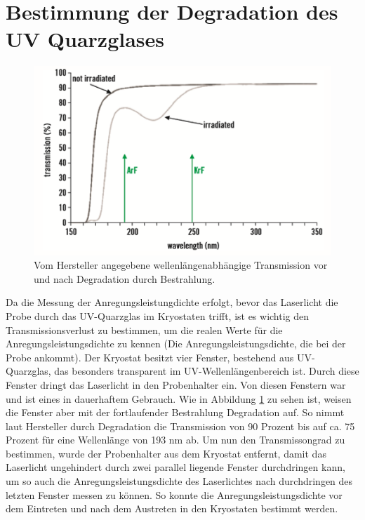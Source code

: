 
\thispagestyle{fancy}

\section{Bestimmung der Degradation des UV Quarzglases}
%
\begin{figure}[htb]
  \centering
  \begin{minipage}[t]{0.49\linewidth}
      \centering
      \includegraphics[width=\linewidth]{Bilder/uvsilicaDegradation.png}
      \caption{Vom Hersteller angegebene wellenlängenabhängige Transmission vor und nach Degradation durch Bestrahlung.}
      \label{fig:degra}
  \end{minipage}
\end{figure}
\noindent
Da die Messung der Anregungsleistungdichte erfolgt, bevor das Laserlicht die Probe durch das UV-Quarzglas im Kryostaten trifft, ist es wichtig den Transmissionsverlust zu bestimmen, um die realen Werte für die Anregungsleistungsdichte zu kennen (Die Anregungsleistungsdichte, die bei der Probe ankommt). Der Kryostat besitzt vier Fenster, bestehend aus UV-Quarzglas, das besonders transparent im UV-Wellenlängenbereich ist. Durch diese Fenster dringt das Laserlicht in den Probenhalter ein. Von diesen Fenstern war und ist eines in dauerhaftem Gebrauch. Wie in Abbildung \ref{fig:degra} zu sehen ist, weisen die Fenster aber mit der fortlaufender Bestrahlung Degradation auf. So nimmt laut Hersteller durch Degradation die Transmission von 90 Prozent bis auf ca. 75 Prozent für eine Wellenlänge von 193 nm ab.
\newline
Um nun den Transmissongrad zu bestimmen, wurde der Probenhalter aus dem Kryostat entfernt, damit das Laserlicht ungehindert durch zwei parallel liegende Fenster durchdringen kann, um so auch die Anregungsleistungsdichte des Laserlichtes nach durchdringen des letzten Fenster messen zu können. So konnte die Anregungsleistungsdichte vor dem Eintreten und nach dem Austreten in den Kryostaten bestimmt werden. 
